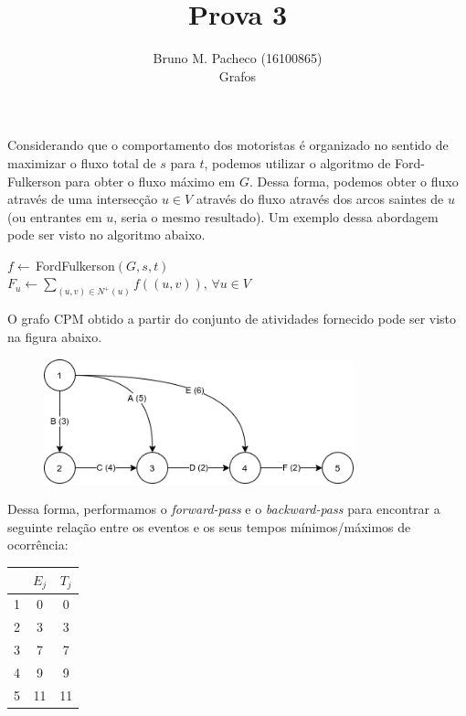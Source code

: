 \documentclass[a4paper]{report}
\begin{document}
 
\title{Prova 3}
\author{Bruno M. Pacheco (16100865)\\
Grafos}
 
\maketitle
 

Considerando que o comportamento dos motoristas é organizado no sentido de maximizar o fluxo total de $s$ para $t$, podemos utilizar o algoritmo de Ford-Fulkerson para obter o fluxo máximo em $G$. Dessa forma, podemos obter o fluxo através de uma intersecção $u\in V$ através do fluxo através dos arcos saintes de $u$ (ou entrantes em $u$, seria o mesmo resultado). Um exemplo dessa abordagem pode ser visto no algoritmo abaixo.

\begin{algorithm}
    $f \gets \,$FordFulkerson$\left( G,s,t \right) $ \\
    $F_u \gets \sum_{\left( u,v \right) \in N^{+}\left( u \right)  } f\left( \left( u,v \right)  \right) ,\, \forall u \in V$ \\
\end{algorithm}


O grafo CPM obtido a partir do conjunto de atividades fornecido pode ser visto na figura abaixo.

\begin{figure}[h]
    \centering
    \includegraphics[width=0.8\textwidth]{cpm.png}
\end{figure}

Dessa forma, performamos o \emph{forward-pass} e o \emph{backward-pass} para encontrar a seguinte relação entre os eventos e os seus tempos mínimos/máximos de ocorrência:
\begin{table}[h]
    \centering
    \begin{tabular}{c | c | c}
     & $E_j$ & $T_j$ \\
     \hline
	1 & 0 & 0 \\
	2 & 3 & 3 \\
	3 & 7 & 7 \\
	4 & 9 & 9 \\
	5 & 11 & 11
    \end{tabular}
\end{table}
\end{document}
